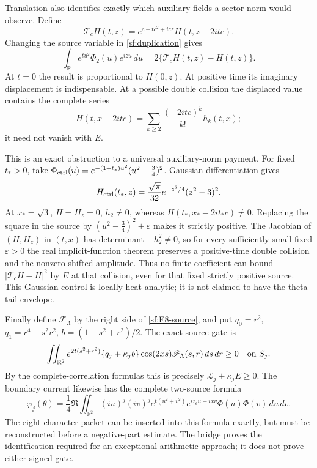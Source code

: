 \documentclass[11pt]{article}
\numberwithin{equation}{section}
\theoremstyle{definition}
\theoremstyle{remark}
\newcommand{\R}{\mathbb R}
\newcommand{\dd}{\,d}
\newcommand{\Lag}{\mathcal L}
\begin{document}
Translation also identifies exactly which auxiliary fields a
sector norm would observe.  Define
\[
 \mathcal T_cH(t,z)=e^{c+tc^2+icz}H(t,z-2itc).
\]
Changing the source variable in \eqref{sf:duplication} gives
\begin{equation}
 \int_{\R}e^{tu^2}\Phi_2(u)e^{izu}\dd u
          =2\{\mathcal T_cH(t,z)-H(t,z)\}.
 \label{sf:heat-translation}
\end{equation}
At \(t=0\) the result is proportional to \(H(0,z)\).  At positive
time its imaginary displacement is indispensable.  At a possible
double collision the displaced value contains the complete series
\[
 H(t,x-2itc)=\sum_{k\ge2}\frac{(-2itc)^k}{k!}h_k(t,x);
\]
it need not vanish with \(E\).

This is an exact obstruction to a universal auxiliary-norm payment.
For fixed \(t_*>0\), take
\(\Phi_{\rm ctrl}(u)=e^{-(1+t_*)u^2}(u^2-\frac34)^2\).  Gaussian
differentiation gives
\[
 H_{\rm ctrl}(t_*,z)=\frac{\sqrt\pi}{32}
                          e^{-z^2/4}(z^2-3)^2 .
\]
At \(x_*=\sqrt3\), \(H=H_z=0\), \(h_2\ne0\), whereas
\(H(t_*,x_*-2it_*c)\ne0\).  Replacing the square in the source by
\((u^2-\frac34)^2+\varepsilon\) makes it strictly positive.
The Jacobian of \((H,H_z)\) in \((t,x)\) has determinant
\(-h_2^2\ne0\), so for every sufficiently small fixed
\(\varepsilon>0\) the real implicit-function theorem preserves a
positive-time double collision and the nonzero shifted amplitude.
Thus no finite coefficient can bound
\(|\mathcal T_cH-H|^2\) by \(E\) at that collision, even for that
fixed strictly positive source.  This Gaussian control is locally
heat-analytic; it is not claimed to have the theta tail envelope.

Finally define \(\mathscr F_\Lambda\) by the right side of
\eqref{sf:E8-source}, and put
\(q_0=r^2\), \(q_1=r^4-s^2r^2\),
\(b=(1-s^2+r^2)/2\).  The exact source gate is
\begin{equation}
 \iint_{\R^2}e^{2t(s^2+r^2)}
       \{q_j+\kappa_jb\}\cos(2xs)\mathscr F_\Lambda(s,r)
                         \dd s\dd r\ge0\quad\hbox{on }S_j.
 \label{sf:E8-gate}
\end{equation}
By the complete-correlation formulas this is precisely
\(\Lag_j+\kappa_jE\ge0\).  The boundary current likewise has the
complete two-source formula
\[
 \varphi_j(\theta)=\frac14\Re\iint_{\R^2}
 (iu)^j(iv)^je^{t(u^2+v^2)}e^{iz_\theta u+ixv}
                              \Phi(u)\Phi(v)\dd u\dd v .
\]
The eight-character packet can be inserted into this formula
exactly, but must be reconstructed before a negative-part estimate.
The bridge proves the identification required for an exceptional
arithmetic approach; it does not prove either signed gate.
\end{document}
